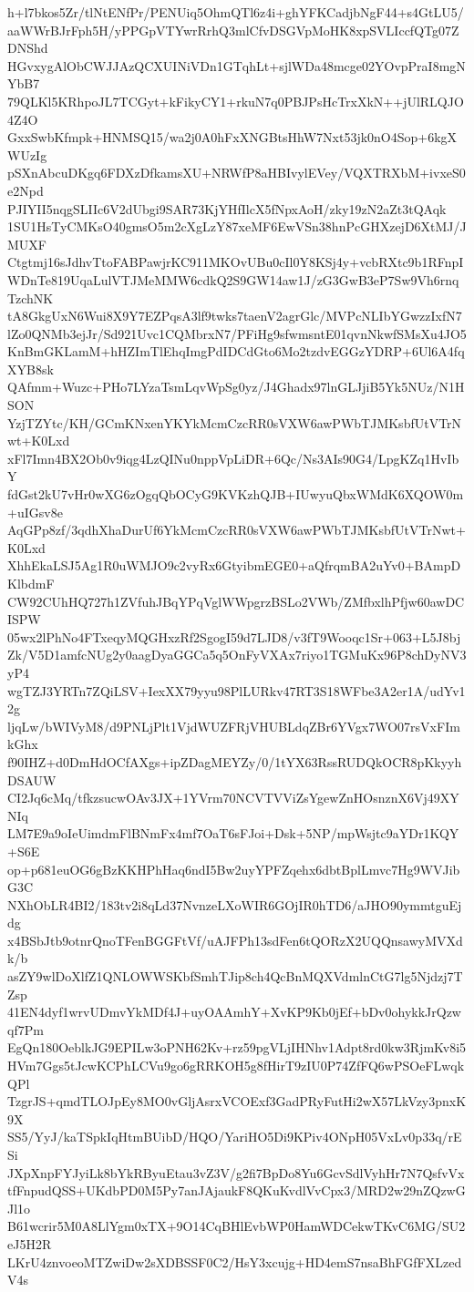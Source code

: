 h+l7bkos5Zr/tlNtENfPr/PENUiq5OhmQTl6z4i+ghYFKCadjbNgF44+s4GtLU5/
aaWWrBJrFph5H/yPPGpVTYwrRrhQ3mlCfvDSGVpMoHK8xpSVLIccfQTg07ZDNShd
HGvxygAlObCWJJAzQCXUINiVDn1GTqhLt+sjlWDa48mcge02YOvpPraI8mgNYbB7
79QLKl5KRhpoJL7TCGyt+kFikyCY1+rkuN7q0PBJPsHcTrxXkN++jUlRLQJO4Z4O
GxxSwbKfmpk+HNMSQ15/wa2j0A0hFxXNGBtsHhW7Nxt53jk0nO4Sop+6kgXWUzIg
pSXnAbcuDKgq6FDXzDfkamsXU+NRWfP8aHBIvylEVey/VQXTRXbM+ivxeS0e2Npd
PJIYII5nqgSLIIc6V2dUbgi9SAR73KjYHfIlcX5fNpxAoH/zky19zN2aZt3tQAqk
1SU1HsTyCMKsO40gmsO5m2cXgLzY87xeMF6EwVSn38hnPcGHXzejD6XtMJ/JMUXF
Ctgtmj16sJdhvTtoFABPawjrKC911MKOvUBu0cIl0Y8KSj4y+vcbRXtc9b1RFnpI
WDnTe819UqaLulVTJMeMMW6cdkQ2S9GW14aw1J/zG3GwB3eP7Sw9Vh6rnqTzchNK
tA8GkgUxN6Wui8X9Y7EZPqsA3lf9twks7taenV2agrGlc/MVPcNLIbYGwzzIxfN7
lZo0QNMb3ejJr/Sd921Uvc1CQMbrxN7/PFiHg9sfwmsntE01qvnNkwfSMsXu4JO5
KnBmGKLamM+hHZImTlEhqImgPdIDCdGto6Mo2tzdvEGGzYDRP+6Ul6A4fqXYB8sk
QAfmm+Wuzc+PHo7LYzaTsmLqvWpSg0yz/J4Ghadx97lnGLJjiB5Yk5NUz/N1HSON
YzjTZYtc/KH/GCmKNxenYKYkMcmCzcRR0sVXW6awPWbTJMKsbfUtVTrNwt+K0Lxd
xFl7Imn4BX2Ob0v9iqg4LzQINu0nppVpLiDR+6Qc/Ns3AIs90G4/LpgKZq1HvIbY
fdGst2kU7vHr0wXG6zOgqQbOCyG9KVKzhQJB+IUwyuQbxWMdK6XQOW0m+uIGsv8e
AqGPp8zf/3qdhXhaDurUf6YkMcmCzcRR0sVXW6awPWbTJMKsbfUtVTrNwt+K0Lxd
XhhEkaLSJ5Ag1R0uWMJO9c2vyRx6GtyibmEGE0+aQfrqmBA2uYv0+BAmpDKlbdmF
CW92CUhHQ727h1ZVfuhJBqYPqVglWWpgrzBSLo2VWb/ZMfbxlhPfjw60awDCISPW
05wx2lPhNo4FTxeqyMQGHxzRf2SgogI59d7LJD8/v3fT9Wooqc1Sr+063+L5J8bj
Zk/V5D1amfcNUg2y0aagDyaGGCa5q5OnFyVXAx7riyo1TGMuKx96P8chDyNV3yP4
wgTZJ3YRTn7ZQiLSV+IexXX79yyu98PlLURkv47RT3S18WFbe3A2er1A/udYv12g
ljqLw/bWIVyM8/d9PNLjPlt1VjdWUZFRjVHUBLdqZBr6YVgx7WO07rsVxFImkGhx
f90IHZ+d0DmHdOCfAXgs+ipZDagMEYZy/0/1tYX63RssRUDQkOCR8pKkyyhDSAUW
CI2Jq6cMq/tfkzsucwOAv3JX+1YVrm70NCVTVViZsYgewZnHOsnznX6Vj49XYNIq
LM7E9a9oIeUimdmFlBNmFx4mf7OaT6sFJoi+Dsk+5NP/mpWsjtc9aYDr1KQY+S6E
op+p681euOG6gBzKKHPhHaq6ndI5Bw2uyYPFZqehx6dbtBplLmvc7Hg9WVJibG3C
NXhObLR4BI2/183tv2i8qLd37NvnzeLXoWIR6GOjIR0hTD6/aJHO90ymmtguEjdg
x4BSbJtb9otnrQnoTFenBGGFtVf/uAJFPh13sdFen6tQORzX2UQQnsawyMVXdk/b
asZY9wlDoXlfZ1QNLOWWSKbfSmhTJip8ch4QcBnMQXVdmlnCtG7lg5Njdzj7TZsp
41EN4dyf1wrvUDmvYkMDf4J+uyOAAmhY+XvKP9Kb0jEf+bDv0ohykkJrQzwqf7Pm
EgQn180OeblkJG9EPILw3oPNH62Kv+rz59pgVLjIHNhv1Adpt8rd0kw3RjmKv8i5
HVm7Ggs5tJcwKCPhLCVu9go6gRRKOH5g8fHirT9zIU0P74ZfFQ6wPSOeFLwqkQPl
TzgrJS+qmdTLOJpEy8MO0vGljAsrxVCOExf3GadPRyFutHi2wX57LkVzy3pnxK9X
SS5/YyJ/kaTSpkIqHtmBUibD/HQO/YariHO5Di9KPiv4ONpH05VxLv0p33q/rESi
JXpXnpFYJyiLk8bYkRByuEtau3vZ3V/g2fi7BpDo8Yu6GcvSdlVyhHr7N7QsfvVx
tfFnpudQSS+UKdbPD0M5Py7anJAjaukF8QKuKvdlVvCpx3/MRD2w29nZQzwGJl1o
B61wcrir5M0A8LlYgm0xTX+9O14CqBHlEvbWP0HamWDCekwTKvC6MG/SU2eJ5H2R
LKrU4znvoeoMTZwiDw2sXDBSSF0C2/HsY3xcujg+HD4emS7nsaBhFGfFXLzedV4s
